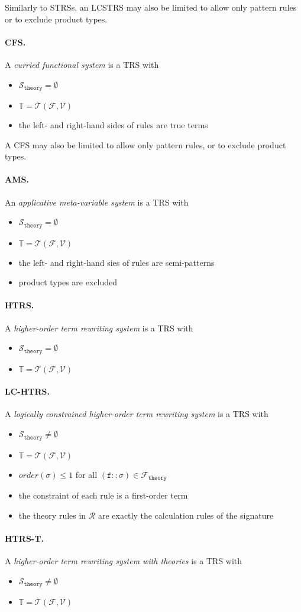 \documentclass{lmcs}
\theoremstyle{theorem}\newtheorem{theorem}{Theorem}
\theoremstyle{theorem}\newtheorem{lemma}[theorem]{Lemma}
\theoremstyle{theorem}\newtheorem{corollary}[theorem]{Corollary}
\theoremstyle{definition}\newtheorem{definition}[theorem]{Definition}
\theoremstyle{definition}\newtheorem{example}[theorem]{Example}
\newcommand{\F}{\mathcal{F}}
\newcommand{\thF}{\mathcal{F}_{\mathtt{theory}}}
\newcommand{\V}{\mathcal{V}}
\newcommand{\thSorts}{\mathcal{S}_{\mathtt{theory}}}
\newcommand{\Terms}{\mathcal{T}}
\newcommand{\Rules}{\mathcal{R}}
\newcommand{\termsset}{\mathbb{T}}
\newcommand{\order}{\mathit{order}}
\newcommand{\atype}{\sigma}
\newcommand{\identifier}[1]{\mathtt{#1}}
\newcommand{\afun}{\identifier{f}}
\newcommand{\myparagraph}[1]{\paragraph{\textbf{#1.}}}
\begin{document}
Similarly to STRSs, an LCSTRS may also be limited to allow only pattern rules
or to exclude product types.

\myparagraph{CFS}
A \emph{curried functional system} is a TRS with
\begin{itemize}
\item $\thSorts = \emptyset$
\item $\termsset = \Terms(\F,\V)$
\item the left- and right-hand sides of rules are true terms
\end{itemize}

A CFS may also be limited to allow only pattern rules, or to exclude product
types.

\myparagraph{AMS}
An \emph{applicative meta-variable system} is a TRS with
\begin{itemize}
\item $\thSorts = \emptyset$
\item $\termsset = \Terms(\F,\V)$
\item the left- and right-hand sies of rules are semi-patterns
\item product types are excluded
\end{itemize}

\myparagraph{HTRS}
A \emph{higher-order term rewriting system} is a TRS with
\begin{itemize}
\item $\thSorts = \emptyset$
\item $\termsset = \Terms(\F,\V)$
\end{itemize}

\myparagraph{LC-HTRS}
A \emph{logically constrained higher-order term rewriting system} is a TRS with
\begin{itemize}
\item $\thSorts \neq \emptyset$
\item $\termsset = \Terms(\F,\V)$
\item $\order(\atype) \leq 1$ for all $(\afun :: \atype) \in \thF$
\item the constraint of each rule is a first-order term
\item the theory rules in $\Rules$ are exactly the calculation rules of the
  signature
\end{itemize}

\myparagraph{HTRS-T}
A \emph{higher-order term rewriting system with theories} is a TRS with
\begin{itemize}
\item $\thSorts \neq \emptyset$
\item $\termsset = \Terms(\F,\V)$
\end{itemize}
\end{document}
